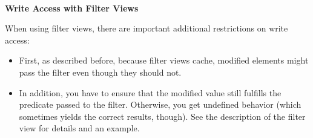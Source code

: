 \noindent
\hspace*{\fill} \\ %
\textbf{Write Access with Filter Views}

When using filter views, there are important additional restrictions on write access:

\begin{itemize}
\item
First, as described before, because filter views cache, modified elements might pass the filter even though they should not.

\item
In addition, you have to ensure that the modified value still fulfills the predicate passed to the filter. Otherwise, you get undefined behavior (which sometimes yields the correct results, though). See the description of the filter view for details and an example.
\end{itemize}

